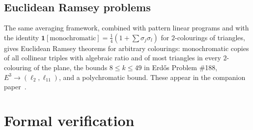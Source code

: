 \documentclass[11pt]{amsart}
\theoremstyle{definition}
\begin{document}
\subsection{Euclidean Ramsey problems}
The same averaging framework, combined with pattern linear programs and with the identity $\mathbf 1[\text{monochromatic}]=\frac14(1+\sum\sigma_j\sigma_l)$ for $2$-colourings of triangles, gives Euclidean Ramsey theorems for arbitrary colourings: monochromatic copies of all collinear triples with algebraic ratio and of most triangles in every $2$-colouring of the plane, the bounds $8\le k\le49$ in Erd\H{o}s Problem \#188, $E^3\to(\ell_2,\ell_{11})$, and a polychromatic bound. These appear in the companion paper~\cite{BassRamsey}.

\section{Formal verification}\label{sec:lean}
\end{document}
